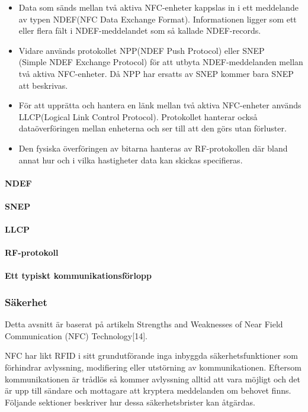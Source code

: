 \documentclass[11pt]{article}
\begin{document}
\begin{itemize}
\item Data som sänds mellan två aktiva NFC-enheter kappslas in i ett meddelande av typen NDEF(NFC Data Exchange Format). Informationen ligger som ett eller flera fält i NDEF-meddelandet som så kallade NDEF-records. 

\item Vidare används protokollet NPP(NDEF Push Protocol) eller SNEP\\(Simple NDEF Exchange Protocol) för att utbyta NDEF-meddelanden mellan två aktiva NFC-enheter. Då NPP har ersatts av SNEP kommer bara SNEP att beskrivas.

\item För att upprätta och hantera en länk mellan två aktiva NFC-enheter används LLCP(Logical Link Control Protocol). Protokollet hanterar också dataöverföringen mellan enheterna och ser till att den görs utan förluster.

\item Den fysiska överföringen av bitarna hanteras av RF-protokollen där bland annat hur och i vilka hastigheter data kan skickas specifieras.

\end{itemize}


\paragraph{NDEF}


\paragraph{SNEP}


\paragraph{LLCP}


\paragraph{RF-protokoll}


\paragraph{Ett typiskt kommunikationsförlopp}


\subsubsection{Säkerhet}
Detta avsnitt är baserat på artikeln Strengths and Weaknesses of Near Field Communication (NFC) Technology[14].

NFC har likt RFID i sitt grundutförande inga inbyggda säkerhetsfunktioner som förhindrar avlyssning, modifiering eller utstörning av kommunikationen. Eftersom kommunikationen är trådlös så kommer avlyssning alltid att vara möjligt och det är upp till sändare och mottagare att kryptera meddelanden om behovet finns. Följande sektioner beskriver hur dessa säkerhetsbrister kan åtgärdas. 
\end{document}
